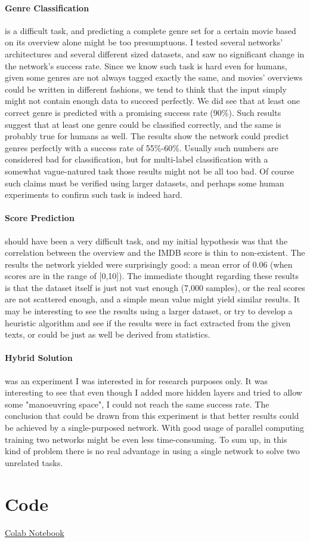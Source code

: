 \documentclass[11pt]{article}
\begin{document}
\paragraph{Genre Classification} is a difficult task, and predicting a complete genre set for a certain movie based on its overview alone might be too presumptuous. 
I tested several networks' architectures and several different sized datasets, and saw no significant change in the network's success rate. 
Since we know such task is hard even for humans, given some genres are not always tagged exactly the same, and movies' overviews could be written in different fashions, we tend to think that the input simply might not contain enough data to succeed perfectly.
We did see that at least one correct genre is predicted with a promising success rate (90\%). Such results suggest that at least one genre could be classified correctly, and the same is probably true for humans as well.
The results show the network could predict genres perfectly with a success rate of 55\%-60\%. 
Usually such numbers are considered bad for classification, but for multi-label classification with a somewhat vague-natured task those results might not be all too bad.
Of course such claims must be verified using larger datasets, and perhaps some human experiments to confirm such task is indeed hard.
\paragraph{Score Prediction} should have been a very difficult task, and my initial hypothesis was that the correlation between the overview and the IMDB score is thin to non-existent.
 The results the network yielded were surprisingly good: a mean error of 0.06 (when scores are in the range of [0,10]). 
 The immediate thought regarding these results is that the dataset itself is just not vast enough (7,000 samples), or the real scores are not scattered enough, and a simple mean value might yield similar results. 
 It may be interesting to see the results using a larger dataset, or try to develop a heuristic algorithm and see if the results were in fact extracted from the given texts, or could be just as well be derived from statistics.
 
 \paragraph{Hybrid Solution} was an experiment I was interested in for research purposes only. 
 It was interesting to see that even though I added more hidden layers and tried to allow some "manoeuvring space", I could not reach the same success rate.
 The conclusion that could be drawn from this experiment is that better results could be achieved by a single-purposed network.
 With good usage of parallel computing training two networks might be even less time-consuming. 
 To sum up, in this kind of problem there is no real advantage in using a single network to solve two unrelated tasks.

\section{Code}

\href{https://colab.research.google.com/drive/12oRdRVn41MzUqHjiC3mgvkRVVA-XlvyB}{Colab Notebook}



\end{document}
